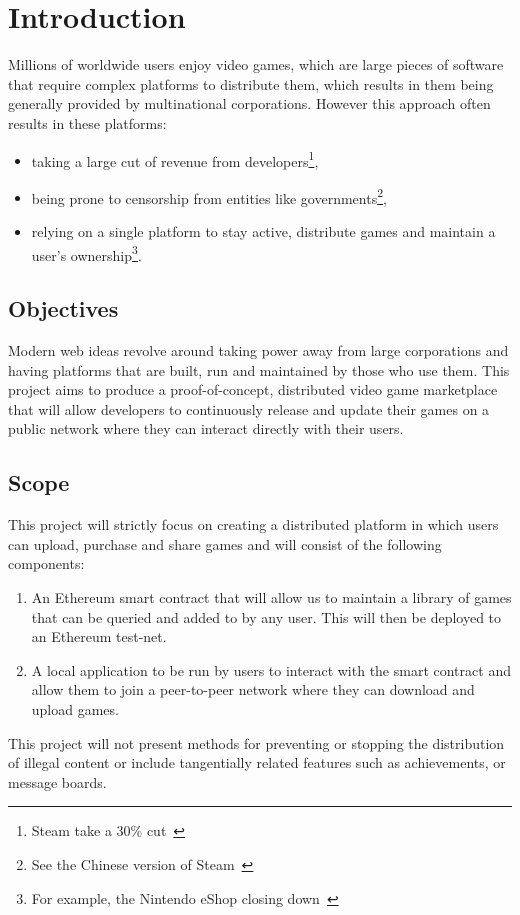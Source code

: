 
\chapter{Introduction}\label{sec:problem}

Millions of worldwide users enjoy video games, which are large pieces of software that require complex platforms to distribute them, which results in them being generally provided by multinational corporations. However this approach often results in these platforms:

\begin{itemize}
  \item taking a large cut of revenue from developers\footnote{Steam take a 30\% cut~\cite{marks_report_2019,brown_valve_2021}},
  \item being prone to censorship from entities like governments\footnote{See the Chinese version of Steam~\cite{noauthor_steam_nodate-1}},
  \item relying on a single platform to stay active, distribute games and maintain a user's ownership\footnote{For example, the Nintendo eShop closing down~\cite{noauthor_nintendo_2022}}.
\end{itemize}

\newparagraph


\section{Objectives}

Modern web ideas revolve around taking power away from large corporations and having platforms that are built, run and maintained by those who use them.
This project aims to produce a proof-of-concept, distributed video game marketplace that will allow developers to continuously release and update their games on a public network where they can interact directly with their users.

\section{Scope}

This project will strictly focus on creating a distributed platform in which users can upload, purchase and share games and will consist of the following components:

\begin{enumerate}
  \item An Ethereum smart contract that will allow us to maintain a library of games that can be queried and added to by any user. This will then be deployed to an Ethereum test-net.
  \item A local application to be run by users to interact with the smart contract and allow them to join a peer-to-peer network where they can download and upload games.
\end{enumerate}

\newparagraph
This project will not present methods for preventing or stopping the distribution of illegal content or include tangentially related features such as achievements, or message boards.
